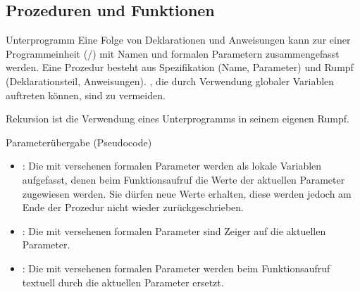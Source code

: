 \subsection{%
    Prozeduren und Funktionen%
}

\begin{Def}{Unterprogramm}
    Eine Folge von Deklarationen und Anweisungen kann zur einer Programmeinheit
    (/) mit Namen und formalen
    Parametern zusammengefasst werden.
    Eine Prozedur besteht aus Spezifikation (Name, Parameter) und Rumpf
    (Deklarationsteil, Anweisungen).
    , die durch Verwendung globaler Variablen auftreten
    können, sind zu vermeiden.
\end{Def}

\begin{Def}{Rekursion}
     ist die Verwendung eines Unterprogramms
    in seinem eigenen Rumpf.
\end{Def}

\begin{Def}{Parameterübergabe (Pseudocode)}
    \begin{itemize}
        \item {}: Die mit  versehenen
        formalen Parameter werden als lokale Variablen aufgefasst, denen beim
        Funktionsaufruf die Werte der aktuellen Parameter zugewiesen werden.
        Sie dürfen neue Werte erhalten, diese werden jedoch am Ende der
        Prozedur nicht wieder zurückgeschrieben.

        \item {}: Die mit  versehenen
        formalen Parameter sind Zeiger auf die aktuellen Parameter.

        \item {}: Die mit  versehenen
        formalen Parameter werden beim Funktionsaufruf textuell durch die
        aktuellen Parameter ersetzt.
    \end{itemize}
\end{Def}

